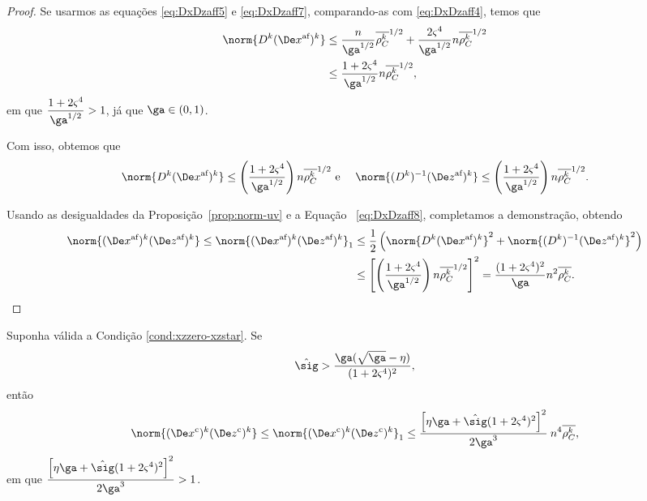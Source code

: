 \begin{proof}
Se usarmos as equações \eqref{eq:DxDzaff5} e \eqref{eq:DxDzaff7}, comparando-as com \eqref{eq:DxDzaff4}, temos que 
\[
\begin{aligned}
\norm{\Dk \dekx} & \leq \frac{n}{\ga^{1/2}}\rhoCkb ^{1/2} +  \frac{2\bdxzstar^{4}}{\ga^{1/2}}n \rhoCkb ^{1/2} \\
				& \leq \frac{1 + 2\bdxzstar^{4} }{\ga^{1/2}} n \rhoCkb ^{1/2},
\end{aligned}
\]
em que	$\dfrac{1 + 2\bdxzstar^{4} }{\ga^{1/2}} >1$,  já que  $\ga\in(0,1)$. 

Com isso, obtemos que 
	\begin{equation}\label{eq:DxDzaff8}
		\norm{\Dk  \dekx }\leq \left(\frac{1 + 2\bdxzstar^{4} }{\ga^{1/2}}\right) n\rhoCkb ^{1/2}\text{ e } \quad  \norm{\Dik  \dekz  }\leq \left(\frac{1 + 2\bdxzstar^{4} }{\ga^{1/2}}\right)n\rhoCkb ^{1/2}.
		\end{equation}




Usando as desigualdades da Proposição~\ref{prop:norm-uv} e  a Equação ~\eqref{eq:DxDzaff8}, completamos a demonstração, obtendo 
\begin{align}
	\norm{ \dekx  \dekz  } \leq \norm{ \dekx  \dekz  }_{1}   & \leq \frac{1}{2}\left(\norm{\Dk \dekx}^{2} + \norm{\Dik  \dekz  }^{2}\right) \notag
  					\\ 
  					& \leq \left[\left(\frac{1 + 2\bdxzstar^{4} }{\ga^{1/2}}\right)  n\rhoCkb ^{1/2}\right]^{2}
  				= \frac{(1 + 2\bdxzstar^{4})^{2} }{\ga} n^{2}\rhoCkb . \qedhere
  				 \label{eq:normDxDzaff}
\end{align}

\end{proof}

\begin{lema}\label{lemma:boundDxDzc}
Suponha válida a Condição  \ref{cond:xzzero-xzstar}. Se  \begin{equation}
	\label{eq:sig-eta-relation}
	\nextsig > \frac{\ga(\sqrt{\ga} - \eta)}{(1+2\bdxzstar^{4})^{2}},
\end{equation} então  
	\begin{equation}\label{eq:lemma-boundDxDzcx}
		\norm{ \Dekcox  \Dekcoz  } \leq \norm{ \Dekcox  \Dekcoz  }_{1} \leq \dfrac{\left[\eta\ga + \nextsig(1+2\bdxzstar^{4})^{2}\right]^{2}}{2\ga^{3}} \: n^{4}\rhoCkb ,
	\end{equation}
	em que $\dfrac{\left[\eta\ga + \nextsig(1+2\bdxzstar^{4})^{2}\right]^{2}}{2\ga^{3}} > \num{1}$.
\end{lema}



